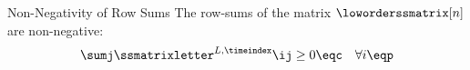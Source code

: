 \begin{lemma}{Non-Negativity of Row Sums}
   The row-sums of the matrix $\loworderssmatrix[n]$ are non-negative:
   \[
     \sumj \ssmatrixletter^{L,\timeindex}\ij \ge 0
       \eqc \quad \forall i \eqp
   \]
\end{lemma}

